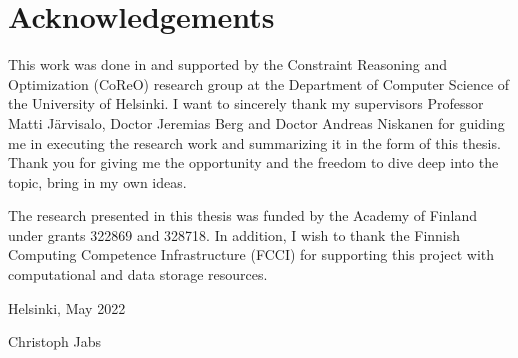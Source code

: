 \chapter*{Acknowledgements}

This work was done in and supported by the Constraint Reasoning and Optimization (CoReO) research group at the Department of Computer Science of the University of Helsinki.
I want to sincerely thank my supervisors Professor Matti Järvisalo, Doctor Jeremias Berg and Doctor Andreas Niskanen for guiding me in executing the research work and summarizing it in the form of this thesis.
Thank you for giving me the opportunity and the freedom to dive deep into the topic, bring in my own ideas.

The research presented in this thesis was funded by the Academy of Finland under grants 322869 and 328718.
In addition, I wish to thank the Finnish Computing Competence Infrastructure (FCCI) for supporting this project with computational and data storage resources.

\begin{flushright}
  Helsinki, May 2022

  Christoph Jabs
\end{flushright}